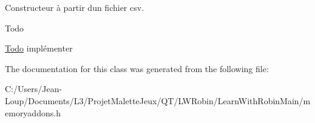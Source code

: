 Constructeur à partir d\textquotesingle{}un fichier csv. 

\begin{DoxyRefDesc}{Todo}
\item[\hyperlink{todo__todo000006}{Todo}]implémenter \end{DoxyRefDesc}


The documentation for this class was generated from the following file\+:\begin{DoxyCompactItemize}
\item 
C\+:/\+Users/\+Jean-\/\+Loup/\+Documents/\+L3/\+Projet\+Malette\+Jeux/\+Q\+T/\+L\+W\+Robin/\+Learn\+With\+Robin\+Main/memoryaddons.\+h\end{DoxyCompactItemize}
